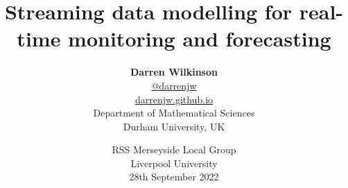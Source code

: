 \documentclass{beamer}
\date{}
\title{Streaming data modelling for real-time monitoring and forecasting}
\author[Darren Wilkinson --- Liverpool, 28/9/22]{\textbf{\large Darren Wilkinson} \\
\url{@darrenjw}\\
\alert{\url{darrenjw.github.io}}\\
Department of Mathematical Sciences\\Durham University, UK}
\date{RSS Merseyside Local Group\\Liverpool University\\28th September 2022}
\begin{document}
\frame{\titlepage}


\end{document}
